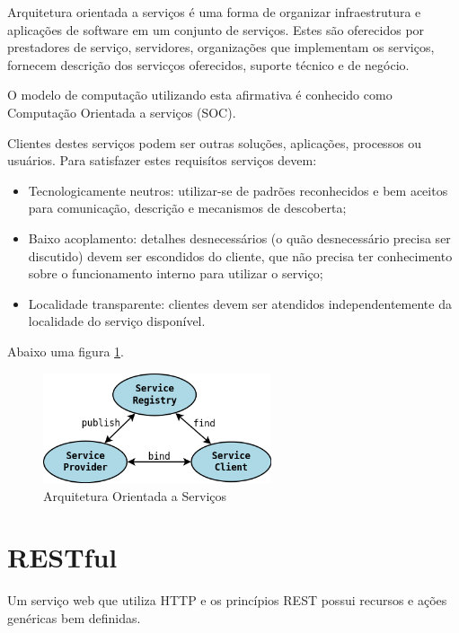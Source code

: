 Arquitetura orientada a servi\c{c}os \'e uma forma de organizar infraestrutura e aplica\c{c}\~oes de software em um conjunto de servi\c{c}os. Estes s\~ao oferecidos por prestadores de servi\c{c}o, servidores, organiza\c{c}\~oes que implementam os servi\c{c}os, fornecem descri\c{c}\~ao dos servic\c{c}os oferecidos, suporte t\'ecnico e de neg\'ocio.

O modelo de computa\c{c}\~ao utilizando esta afirmativa \'e conhecido como Computa\c{c}\~ao Orientada a servi\c{c}os (SOC). \cite{581580}

Clientes destes servi\c{c}os podem ser outras solu\c{c}\~oes, aplica\c{c}\~oes, processos ou usu\'arios. Para satisfazer estes requis\'itos servi\c{c}os devem:
\begin{itemize}
\item Tecnologicamente neutros: utilizar-se de padr\~oes reconhecidos e bem aceitos para comunica\c{c}\~ao, descri\c{c}\~ao e mecanismos de descoberta;
\item Baixo acoplamento: detalhes desnecess\'arios (o qu\~ao desnecess\'ario precisa ser discutido) devem ser escondidos do cliente, que n\~ao precisa ter conhecimento sobre o funcionamento interno para utilizar o servi\c{c}o;
\item Localidade transparente: clientes devem ser atendidos independentemente da localidade do servi\c{c}o dispon\'ivel.
\end{itemize}

Abaixo uma figura \ref{soaOverview}.

\begin{figure}[h]
   \label{soaOverview}
   \centering
   \includegraphics[width=0.6\textwidth]{figuras/soa.png}
   \caption{Arquitetura Orientada a Servi\c{c}os}
\end{figure}

\section{RESTful}

Um servi\c{c}o web que utiliza HTTP e os princ\'ipios REST possui recursos e a\c{c}\~oes gen\'ericas bem definidas.\cite{rest}

